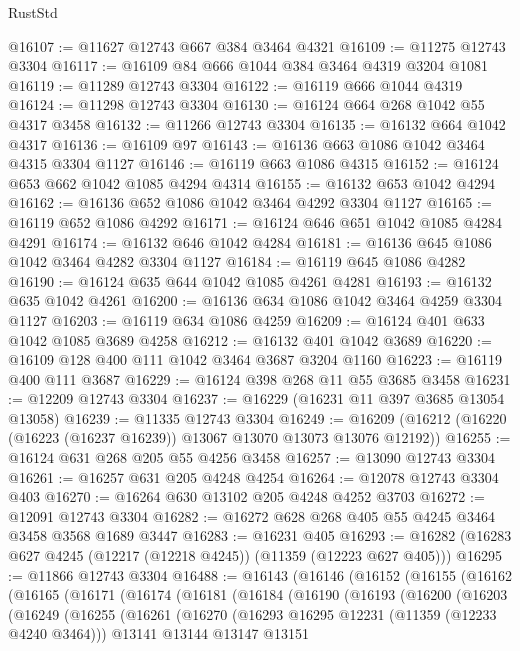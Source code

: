 \begin{lexlean}{RustStd}
\begin{coremodule}
{{{{{{{{{{{{{{{{{{{@16107 := @11627 @12743 @667 @384 @3464 @4321
@16109 := @11275 @12743 @3304
@16117 := @16109 @84 @666 @1044 @384 @3464 @4319 @3204 @1081
@16119 := @11289 @12743 @3304
@16122 := @16119 @666 @1044 @4319
@16124 := @11298 @12743 @3304
@16130 := @16124 @664 @268 @1042 @55 @4317 @3458
@16132 := @11266 @12743 @3304
@16135 := @16132 @664 @1042 @4317
@16136 := @16109 @97
@16143 := @16136 @663 @1086 @1042 @3464 @4315 @3304 @1127
@16146 := @16119 @663 @1086 @4315
@16152 := @16124 @653 @662 @1042 @1085 @4294 @4314
@16155 := @16132 @653 @1042 @4294
@16162 := @16136 @652 @1086 @1042 @3464 @4292 @3304 @1127
@16165 := @16119 @652 @1086 @4292
@16171 := @16124 @646 @651 @1042 @1085 @4284 @4291
@16174 := @16132 @646 @1042 @4284
@16181 := @16136 @645 @1086 @1042 @3464 @4282 @3304 @1127
@16184 := @16119 @645 @1086 @4282
@16190 := @16124 @635 @644 @1042 @1085 @4261 @4281
@16193 := @16132 @635 @1042 @4261
@16200 := @16136 @634 @1086 @1042 @3464 @4259 @3304 @1127
@16203 := @16119 @634 @1086 @4259
@16209 := @16124 @401 @633 @1042 @1085 @3689 @4258
@16212 := @16132 @401 @1042 @3689
@16220 := @16109 @128 @400 @111 @1042 @3464 @3687 @3204 @1160
@16223 := @16119 @400 @111 @3687
@16229 := @16124 @398 @268 @11 @55 @3685 @3458
@16231 := @12209 @12743 @3304
@16237 := @16229 (@16231 @11 @397 @3685 @13054 @13058)
@16239 := @11335 @12743 @3304
@16249 := @16209 (@16212 (@16220 (@16223 (@16237 @16239)) @13067 @13070 @13073 @13076 @12192))
@16255 := @16124 @631 @268 @205 @55 @4256 @3458
@16257 := @13090 @12743 @3304
@16261 := @16257 @631 @205 @4248 @4254
@16264 := @12078 @12743 @3304 @403
@16270 := @16264 @630 @13102 @205 @4248 @4252 @3703
@16272 := @12091 @12743 @3304
@16282 := @16272 @628 @268 @405 @55 @4245 @3464 @3458 @3568 @1689 @3447
@16283 := @16231 @405
@16293 := @16282 (@16283 @627 @4245 (@12217 (@12218 @4245)) (@11359 (@12223 @627 @405)))
@16295 := @11866 @12743 @3304
@16488 := @16143
    (@16146
      (@16152
        (@16155
          (@16162
            (@16165
              (@16171
                (@16174
                  (@16181
                    (@16184
                      (@16190
                        (@16193
                          (@16200
                            (@16203
                              (@16249
                                (@16255
                                  (@16261
                                    (@16270
                                      (@16293 @16295 @12231 (@11359 (@12233 @4240 @3464)))
                                      @13141
                                      @13144
                                      @13147
                                      @13151
}}}}}}}}}}}}}}}}}}}
\end{coremodule}
\end{lexlean}
